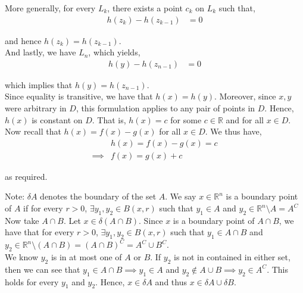 \documentclass[12pt]{article}
\newenvironment{problem}[2][Problem]{\begin{trivlist}
\item[\hskip \labelsep {\bfseries #1}\hskip \labelsep {\bfseries #2.}]}{\end{trivlist}}
\begin{document}
More generally, for every $L_k$, there exists a point $c_k$ on $L_k$ such that,
\begin{align*}
h(z_k) - h(z_{k-1}) &= 0
\end{align*}

and hence $h(z_k) = h(z_{k-1})$.\\

And lastly, we have $L_n$, which yields,
\begin{align*}
h(y) - h(z_{n-1}) &= 0
\end{align*}

which implies that $h(y) = h(z_{n-1})$.\\

Since equality is transitive, we have that $h(x) = h(y)$. Moreover, since $x, y$ were arbitrary in $D$, this formulation applies to any pair of points in $D$. Hence, $h(x)$ is constant on $D$. That is, $h(x) = c$ for some $c \in \mathbb{R}$ and for all $x \in D$.\\

Now recall that $h(x) = f(x) - g(x)$ for all $x \in D$. We thus have,
\begin{align*}
&h(x) = f(x) - g(x) = c\\
\implies &f(x) = g(x) + c
\end{align*}

as required.

\begin{problem}{6}
\end{problem}

Note: $\delta A$ denotes the boundary of the set $A$. We say $x \in \mathbb{R}^n$ is a boundary point of $A$ if for every $r > 0$, $\exists y_1, y_2 \in B(x, r)$ such that $y_1 \in A$ and $y_2 \in \mathbb{R}^n \setminus A = A^C$\\

Now take $A \cap B$. Let $x \in \delta(A \cap B)$. Since $x$ is a boundary point of $A \cap B$, we have that for every $r > 0$, $\exists y_1, y_2 \in B(x, r)$ such that $y_1 \in A \cap B$ and $y_2 \in \mathbb{R}^n \setminus (A \cap B) = (A \cap B)^C = A^C \cup B^C$.\\

We know $y_2$ is in at most one of $A$ or $B$. If $y_2$ is not in contained in either set, then we can see that $y_1 \in A \cap B \implies y_1 \in A$ and $y_2 \not\in A \cup B \implies y_2 \in A^C$. This holds for every $y_1$ and $y_2$. Hence, $x \in \delta A$ and thus $x \in \delta A \cup \delta B$.\\
\end{document}
